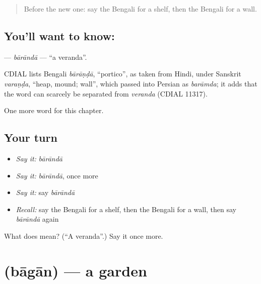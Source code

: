 \label{lesson:BN-C112-baranda}



\begin{quote}
Before the new one: say the Bengali for a shelf, then the Bengali for a wall.
\end{quote}

\subsection*{You'll want to know: }
\textbf{} — \emph{bārāndā} — \textquotedblleft{}a veranda\textquotedblright{}.

\begin{cousinweb}
CDIAL lists Bengali \emph{bārāṇḍā}, \textquotedblleft{}portico\textquotedblright{}, as taken from Hindi, under Sanskrit \emph{varaṇḍa}, \textquotedblleft{}heap, mound; wall\textquotedblright{}, which passed into Persian as \emph{barāmda}; it adds that the word can scarcely be separated from \emph{veranda} (CDIAL 11317).
\end{cousinweb}

\begin{grammarlens}[title={What you've built}]
One more word for this chapter.
\end{grammarlens}

\subsection*{Your turn}
\begin{itemize}
\raggedright
  \item \emph{Say it:} \emph{bārāndā}
  \item \emph{Say it:} \emph{bārāndā}, once more
  \item \emph{Say it:} say \emph{bārāndā}
  \item \emph{Recall:} say the Bengali for a shelf, then the Bengali for a wall, then say \emph{bārāndā} again
\end{itemize}

\begin{tcolorbox}[breakable,colback=teal!4,colframe=teal!35!black,title={Before you move on}]
What does  mean? (\textquotedblleft{}A veranda\textquotedblright{}.) Say it once more.
\end{tcolorbox}
\section[\texorpdfstring{\bn{বাগান} (bāgān)}{বাগান (bāgān)}]{ (bāgān) — a garden}

